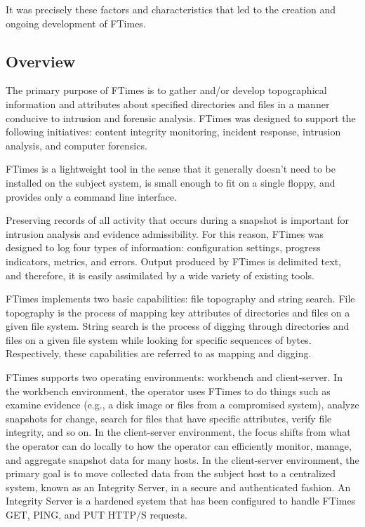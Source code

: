 \documentclass[10pt]{article}
\begin{document}
It was precisely these factors and characteristics that led to the
creation and ongoing development of FTimes.

\subsection{Overview}

The primary purpose of FTimes is to gather and/or develop
topographical information and attributes about specified directories
and files in a manner conducive to intrusion and forensic analysis.
FTimes was designed to support the following initiatives: content
integrity monitoring, incident response, intrusion analysis, and
computer forensics.

FTimes is a lightweight tool in the sense that it generally doesn't
need to be installed on the subject system, is small enough to fit on
a single floppy, and provides only a command line interface.

Preserving records of all activity that occurs during a snapshot is
important for intrusion analysis and evidence admissibility.  For this
reason, FTimes was designed to log four types of information:
configuration settings, progress indicators, metrics, and errors.
Output produced by FTimes is delimited text, and therefore, it is
easily assimilated by a wide variety of existing tools.

FTimes implements two basic capabilities: file topography and string
search.  File topography is the process of mapping key attributes of
directories and files on a given file system.  String search is the
process of digging through directories and files on a given file
system while looking for specific sequences of bytes.  Respectively,
these capabilities are referred to as mapping and digging.

FTimes supports two operating environments: workbench and
client-server.  In the workbench environment, the operator uses FTimes
to do things such as examine evidence (e.g., a disk image or files
from a compromised system), analyze snapshots for change, search for
files that have specific attributes, verify file integrity, and so on.
In the client-server environment, the focus shifts from what the
operator can do locally to how the operator can efficiently monitor,
manage, and aggregate snapshot data for many hosts.  In the
client-server environment, the primary goal is to move collected data
from the subject host to a centralized system, known as an Integrity
Server, in a secure and authenticated fashion.  An Integrity Server is
a hardened system that has been configured to handle FTimes GET, PING,
and PUT HTTP/S requests.
\end{document}
